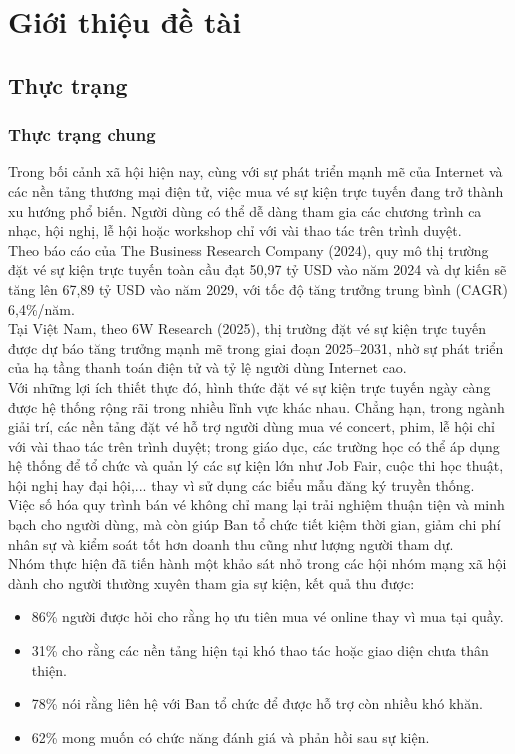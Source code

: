 \section{Giới thiệu đề tài}
\subsection{Thực trạng}
\subsubsection{Thực trạng chung}
\indent \indent Trong bối cảnh xã hội hiện nay, cùng với sự phát triển mạnh mẽ của Internet và các nền tảng thương mại điện tử, việc mua vé sự kiện trực tuyến đang trở thành xu hướng phổ biến. Người dùng có thể dễ dàng tham gia các chương trình ca nhạc, hội nghị, lễ hội hoặc workshop chỉ với vài thao tác trên trình duyệt.\\
\indent Theo báo cáo của The Business Research Company (2024), quy mô thị trường đặt vé sự kiện trực tuyến toàn cầu đạt 50,97 tỷ USD vào năm 2024 và dự kiến sẽ tăng lên 67,89 tỷ USD vào năm 2029, với tốc độ tăng trưởng trung bình (CAGR) 6,4\%/năm.\\
\indent Tại Việt Nam, theo 6W Research (2025), thị trường đặt vé sự kiện trực tuyến được dự báo tăng trưởng mạnh mẽ trong giai đoạn 2025–2031, nhờ sự phát triển của hạ tầng thanh toán điện tử và tỷ lệ người dùng Internet cao. \\
\indent Với những lợi ích thiết thực đó, hình thức đặt vé sự kiện trực tuyến ngày càng được hệ thống rộng rãi trong nhiều lĩnh vực khác nhau. Chẳng hạn, trong ngành giải trí, các nền tảng đặt vé hỗ trợ người dùng mua vé concert, phim, lễ hội chỉ với vài thao tác trên trình duyệt; trong giáo dục, các trường học có thể áp dụng hệ thống để tổ chức và quản lý các sự kiện lớn như Job Fair, cuộc thi học thuật, hội nghị hay đại hội,... thay vì sử dụng các biểu mẫu đăng ký truyền thống. \\
\indent Việc số hóa quy trình bán vé không chỉ mang lại trải nghiệm thuận tiện và minh bạch cho người dùng, mà còn giúp Ban tổ chức tiết kiệm thời gian, giảm chi phí nhân sự và kiểm soát tốt hơn doanh thu cũng như lượng người tham dự.\\
\indent Nhóm thực hiện đã tiến hành một khảo sát nhỏ trong các hội nhóm mạng xã hội dành cho người thường xuyên tham gia sự kiện, kết quả thu được:
\begin{itemize}
    \item[-] 86\% người được hỏi cho rằng họ ưu tiên mua vé online thay vì mua tại quầy.
    \item[-] 31\% cho rằng các nền tảng hiện tại khó thao tác hoặc giao diện chưa thân thiện.
    \item[-] 78\% nói rằng liên hệ với Ban tổ chức để được hỗ trợ còn nhiều khó khăn.
    \item[-] 62\% mong muốn có chức năng đánh giá và phản hồi sau sự kiện.
\end{itemize}
